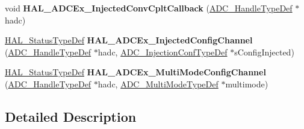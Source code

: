 \begin{DoxyCompactItemize}
void {\bfseries H\+A\+L\+\_\+\+A\+D\+C\+Ex\+\_\+\+Injected\+Conv\+Cplt\+Callback} (\mbox{\hyperlink{struct_a_d_c___handle_type_def}{A\+D\+C\+\_\+\+Handle\+Type\+Def}} $\ast$hadc)
\item 
\mbox{\label{group___a_d_c_ex___exported___functions___group1_ga5736a78398eb51ddeb09dd83d1243045}} 
\mbox{\hyperlink{stm32f7xx__hal__def_8h_a63c0679d1cb8b8c684fbb0632743478f}{H\+A\+L\+\_\+\+Status\+Type\+Def}} {\bfseries H\+A\+L\+\_\+\+A\+D\+C\+Ex\+\_\+\+Injected\+Config\+Channel} (\mbox{\hyperlink{struct_a_d_c___handle_type_def}{A\+D\+C\+\_\+\+Handle\+Type\+Def}} $\ast$hadc, \mbox{\hyperlink{struct_a_d_c___injection_conf_type_def}{A\+D\+C\+\_\+\+Injection\+Conf\+Type\+Def}} $\ast$s\+Config\+Injected)
\item 
\mbox{\label{group___a_d_c_ex___exported___functions___group1_gabfe8b04f9cfda94bc8aad912470122f5}} 
\mbox{\hyperlink{stm32f7xx__hal__def_8h_a63c0679d1cb8b8c684fbb0632743478f}{H\+A\+L\+\_\+\+Status\+Type\+Def}} {\bfseries H\+A\+L\+\_\+\+A\+D\+C\+Ex\+\_\+\+Multi\+Mode\+Config\+Channel} (\mbox{\hyperlink{struct_a_d_c___handle_type_def}{A\+D\+C\+\_\+\+Handle\+Type\+Def}} $\ast$hadc, \mbox{\hyperlink{struct_a_d_c___multi_mode_type_def}{A\+D\+C\+\_\+\+Multi\+Mode\+Type\+Def}} $\ast$multimode)
\end{DoxyCompactItemize}


\subsection{Detailed Description}
